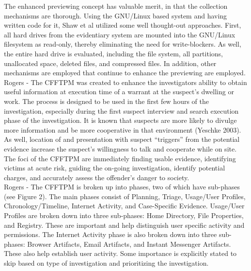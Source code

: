 \documentclass[12pt]{article}
\begin{document}
The enhanced previewing concept has valuable merit, in that the collection mechanisms are thorough.  Using the
GNU/Linux based system and having written code for it, Shaw et al\cite{shaw2013practical} utilized some well
thought-out approaches.  First, all hard drives from the evidentiary system are mounted into the GNU/Linux
filesystem as read-only, thereby eliminating the need for write-blockers.  As well, the entire hard drive is
evaluated, including the file system, all partitions, unallocated space, deleted files, and compressed files.  In
addition, other mechanisms are employed that continue to enhance the previewing are employed.\\

Rogers - The CFFTPM was created to enhance the investigators ability to obtain useful information at execution time of a 
warrant at the suspect's dwelling or work.  The process is designed to be used in the first few hours of the 
investigation, especially during the first suspect interview and search execution phase of the investigation.  It is
known that suspects are more likely to divulge more information and be more cooperative in that environment (Yeschke
2003\cite{yeschke2003art}).  As well, location of and presentation with suspect ``triggers'' from the potential evidence
increase the suspect's willingness to talk and cooperate while on site.\cite{rogers2006computer}\\

The foci of the CFFTPM are immediately finding usable evidence, identifying victims at acute risk, guiding the
on-going investigation, identify potential charges, and accurately assess the offender's danger to society.\\

Rogers - The CFFTPM is broken up into phases, two of which have sub-phases (see Figure 2).  The main phases consist of Planning, Triage,
Usage/User Profiles, Chronology/Timeline, Internet Activity, and Case-Specific Evidence.   Usage/User Profiles are broken down into three sub-phases:
Home Directory, File Properties, and Registry.  These are important and help distinguish user specific activity and
permissions.  The Internet Activity phase is also broken down into three sub-phases: Browser Artifacts, Email
Artifacts, and Instant Messenger Artifacts.  These also help establish user activity.  Some importance is explicitly
stated to skip based on type of investigation and prioritizing the investigation.\\ 
\end{document}
